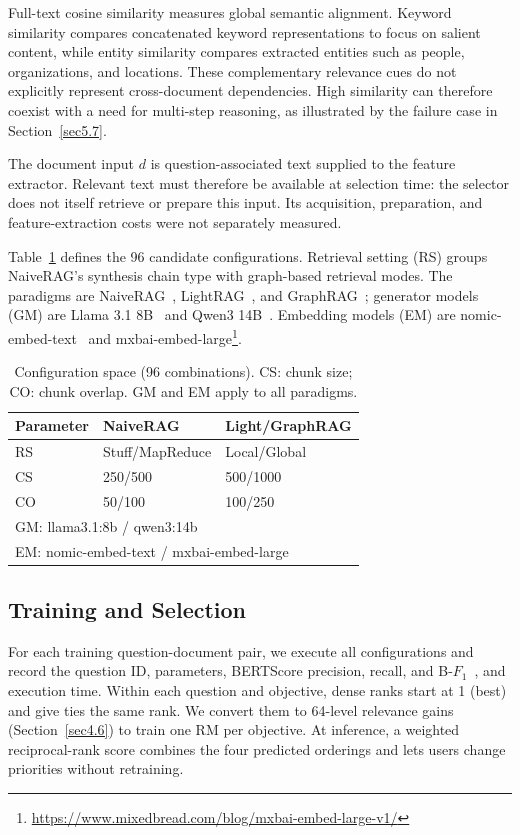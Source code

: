 Full-text cosine similarity measures global semantic alignment. Keyword similarity compares concatenated keyword representations to focus on salient content, while entity similarity compares extracted entities such as people, organizations, and locations. These complementary relevance cues do not explicitly represent cross-document dependencies. High similarity can therefore coexist with a need for multi-step reasoning, as illustrated by the failure case in Section~\ref{sec5.7}.

The document input $d$ is question-associated text supplied to the feature extractor. Relevant text must therefore be available at selection time: the selector does not itself retrieve or prepare this input. Its acquisition, preparation, and feature-extraction costs were not separately measured.

Table~\ref{hyperparameters_in_RAG} defines the 96 candidate configurations. Retrieval setting (RS) groups NaiveRAG's synthesis chain type with graph-based retrieval modes. The paradigms are NaiveRAG~\cite{Lewis20}, LightRAG~\cite{Guo25}, and GraphRAG~\cite{edge25}; generator models (GM) are Llama 3.1 8B~\cite{Meta24} and Qwen3 14B~\cite{qwen25}. Embedding models (EM) are nomic-embed-text~\cite{nussbaum24} and mxbai-embed-large\footnote{\url{https://www.mixedbread.com/blog/mxbai-embed-large-v1/}}.

\begin{table}[tb]
\centering\small
\caption{Configuration space (96 combinations). CS: chunk size; CO: chunk overlap. GM and EM apply to all paradigms.}
\label{hyperparameters_in_RAG}
\begin{tabular}{lll}
\toprule
Parameter & NaiveRAG & Light/GraphRAG \\
\midrule
RS & Stuff/MapReduce & Local/Global \\
CS & 250/500 & 500/1000 \\
CO & 50/100 & 100/250 \\
\midrule
\multicolumn{3}{l}{GM: llama3.1:8b / qwen3:14b} \\
\multicolumn{3}{l}{EM: nomic-embed-text / mxbai-embed-large} \\
\bottomrule
\end{tabular}
\end{table}

\subsection{Training and Selection} \label{sec3.2}\label{sec3.3}
For each training question-document pair, we execute all configurations and record the question ID, parameters, BERTScore precision, recall, and B-$F_1$~\cite{zhang20}, and execution time. Within each question and objective, dense ranks start at 1 (best) and give ties the same rank. We convert them to 64-level relevance gains (Section~\ref{sec4.6}) to train one RM per objective. At inference, a weighted reciprocal-rank score combines the four predicted orderings and lets users change priorities without retraining.


